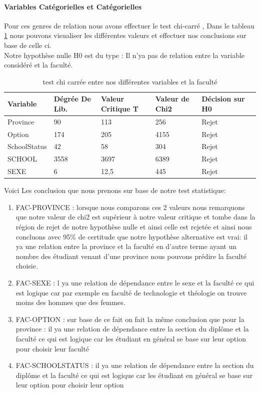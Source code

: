  \paragraph{Variables Catégorielles et Catégorielles}
 Pour ces genres de relation nous avons effectuer le test chi-carré , Dans le tableau \ref{tab:chi-Carrée} nous pouvons visualiser les  différentes valeurs et effectuer nos conclusions sur base de celle ci.\\
 Notre hypothèse nulle H0 est du type : Il n'ya pas de relation entre la variable considéré et la faculté. 
 \begin{table}
 	\centering
 	\begingroup %
 	\captionsetup{type=table} %
 	\caption{test chi carrée entre  nos  différentes variables et la faculté }
 	\label{tab:chi-Carrée}
 	\begin{tabular}{lllllr}
 		\toprule
 		 Variable &   Dégrée De Lib.  &         Valeur Critique T & Valeur de Chi2 &  Décision sur H0 \\
 		\midrule
        Province & 90&113&256&Rejet\\
        Option & 174 & 205& 4155& Rejet \\
        SchoolStatus &42&58&304&Rejet\\
        SCHOOL&3558&3697&6389&Rejet\\
        SEXE&6&12,5&445&Rejet\\
 		\bottomrule
 	\end{tabular}
 	\endgroup
 \end{table}
 Voici Les conclusion que nous prenons sur base de notre test statistique:
 \begin{enumerate}
 	\item FAC-PROVINCE :
 	lorsque nous comparons ces 2 valeurs nous remarquons que notre valeur de chi2 est supérieur à notre valeur critique et tombe dans la région de rejet de notre hypothèse nulle et ainsi celle est rejetée et ainsi nous concluons avec 95\% de certitude que notre hypothèse alternative est vrai: il ya une relation entre la province et la faculté en d'autre terme ayant un nombre des étudiant venant d'une province nous pouvons prédire la faculté choisie.
 	\item FAC-SEXE :
 	l ya une relation de dépendance entre le sexe et la faculté ce qui est logique car par exemple en faculté de technologie et théologie on trouve moins des hommes que des femmes.
 	\item FAC-OPTION :
 	sur base de ce fait on fait la même conclusion que pour la province : il ya une relation de dépendance entre la section du diplôme et la faculté ce qui est logique car les étudiant en général se base sur leur option pour choisir leur faculté
 	\item FAC-SCHOOLSTATUS :
 	il ya une relation de dépendance entre la section du diplôme et la faculté ce qui est logique car les étudiant en général se base sur leur option pour choisir leur option
 \end{enumerate}
